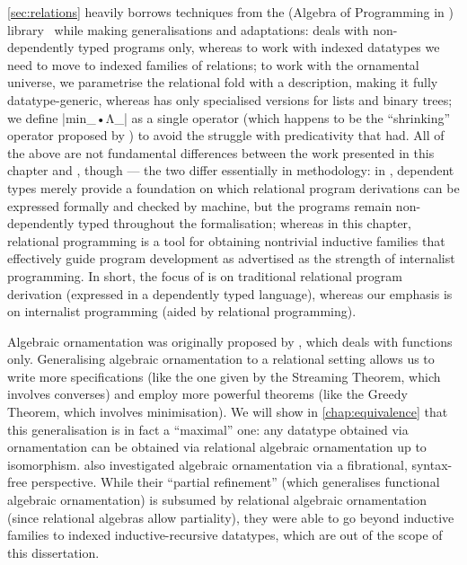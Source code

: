 \autoref{sec:relations} heavily borrows techniques from the  (Algebra of Programming in \Agda) library~\citep{Mu-AoPA} while making generalisations and adaptations:
 deals with non-dependently typed programs only, whereas to work with indexed datatypes we need to move to indexed families of relations; to work with the ornamental universe, we parametrise the relational fold with a description, making it fully datatype-generic, whereas  has only specialised versions for lists and binary trees; we define |min_•Λ_| as a single operator (which happens to be the ``shrinking'' operator proposed by \citet{Mu-Galois}) to avoid the struggle with predicativity that  had.
All of the above are not fundamental differences between the work presented in this chapter and , though --- the two differ essentially in methodology: in , dependent types merely provide a foundation on which relational program derivations can be expressed formally and checked by machine, but the programs remain non-dependently typed throughout the formalisation; whereas in this chapter, relational programming is a tool for obtaining nontrivial inductive families that effectively guide program development as advertised as the strength of internalist programming.
In short, the focus of  is on traditional relational program derivation (expressed in a dependently typed language), whereas our emphasis is on internalist programming (aided by relational programming).

Algebraic ornamentation was originally proposed by \citet{McBride-ornaments}, which deals with functions only.
Generalising algebraic ornamentation to a relational setting allows us to write more specifications (like the one given by the Streaming Theorem, which involves converses) and employ more powerful theorems (like the Greedy Theorem, which involves minimisation).
We will show in \autoref{chap:equivalence} that this generalisation is in fact a ``maximal'' one: any datatype obtained via ornamentation can be obtained via relational algebraic ornamentation up to isomorphism.
\citet{Atkey-refining-inductive-types} also investigated algebraic ornamentation via a fibrational, syntax-free perspective.
While their ``partial refinement'' (which generalises functional algebraic ornamentation) is subsumed by relational algebraic ornamentation (since relational algebras allow partiality), they were able to go beyond inductive families to indexed inductive-recursive datatypes, which are out of the scope of this dissertation.

